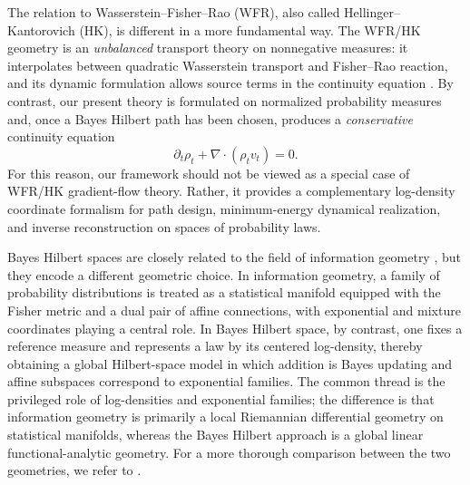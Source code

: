 \documentclass{article}
\theoremstyle{definition}
\begin{document}
The relation to Wasserstein--Fisher--Rao (WFR), also called Hellinger--Kantorovich (HK), is different in a more fundamental way.
The WFR/HK geometry is an
\emph{unbalanced} transport theory on nonnegative measures: it interpolates between quadratic
Wasserstein transport and Fisher--Rao reaction, and its dynamic formulation allows source terms in
the continuity equation
\citep{chizatPeyreSchmitzerVialard2018Interpolating,
    chizatPeyreSchmitzerVialard2018Unbalanced,
    lieroMielkeSavare2018}. By contrast, our present theory is formulated on normalized probability
measures and, once a Bayes Hilbert path has been chosen, produces a \emph{conservative}
continuity equation
\[
    \partial_t \rho_t + \nabla \cdot (\rho_t v_t) = 0.
\]
For this reason, our framework should not be viewed as a special case of WFR/HK gradient-flow
theory. Rather, it provides a complementary log-density coordinate formalism for path design,
minimum-energy dynamical realization, and inverse reconstruction on spaces of probability laws.

Bayes Hilbert spaces are closely related to the field of information geometry \citep{Amari2016,AmariNagaoka2000,AyJostLeSchwachhoefer2017}, but they encode
a different geometric choice. In information geometry, a family of probability distributions is
treated as a statistical manifold equipped with the Fisher metric and a dual pair of affine
connections, with exponential and mixture coordinates playing a central role. In Bayes Hilbert
space, by contrast, one fixes a reference measure and represents a law by its centered
log-density, thereby obtaining a global Hilbert-space model in which addition is Bayes
updating and affine subspaces correspond to exponential families. The common thread is the privileged
role of log-densities and exponential families; the difference is that information geometry is
primarily a local Riemannian differential geometry on statistical manifolds, whereas the
Bayes Hilbert approach is a global linear functional-analytic geometry. For a more thorough comparison between the two geometries, we refer to \citet{pistoneUnifiedApproachAitchisons2024}.
\end{document}
